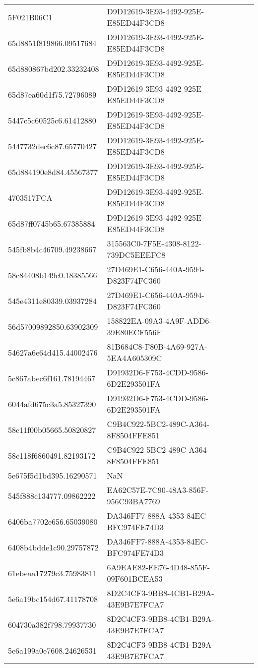 \begin{tabular}{ll}
5F021B06C1 & D9D12619-3E93-4492-925E-E85ED44F3CD8 \\
65d8851f819866.09517684 & D9D12619-3E93-4492-925E-E85ED44F3CD8 \\
65d880867bd202.33232408 & D9D12619-3E93-4492-925E-E85ED44F3CD8 \\
65d87ea60d1f75.72796089 & D9D12619-3E93-4492-925E-E85ED44F3CD8 \\
5447c5c60525c6.61412880 & D9D12619-3E93-4492-925E-E85ED44F3CD8 \\
5447732dec6c87.65770427 & D9D12619-3E93-4492-925E-E85ED44F3CD8 \\
65d884190e8d84.45567377 & D9D12619-3E93-4492-925E-E85ED44F3CD8 \\
4703517FCA & D9D12619-3E93-4492-925E-E85ED44F3CD8 \\
65d87ff0745b65.67385884 & D9D12619-3E93-4492-925E-E85ED44F3CD8 \\
545fb8b4c46709.49238667 & 315563C0-7F5E-4308-8122-739DC5EEEFC8 \\
58c84408b149c0.18385566 & 27D469E1-C656-440A-9594-D823F74FC360 \\
545e4311e80339.03937284 & 27D469E1-C656-440A-9594-D823F74FC360 \\
56d57009892850.63902309 & 158822EA-09A3-4A9F-ADD6-39E80ECF556F \\
54627a6e64d415.44002476 & 81B684C8-F80B-4A69-927A-5EA4A605309C \\
5c867abec6f161.78194467 & D91932D6-F753-4CDD-9586-6D2E293501FA \\
6044afd675c3a5.85327390 & D91932D6-F753-4CDD-9586-6D2E293501FA \\
58c11f00b05665.50820827 & C9B4C922-5BC2-489C-A364-8F8504FFE851 \\
58c118f6860491.82193172 & C9B4C922-5BC2-489C-A364-8F8504FFE851 \\
5e675f5d1bd395.16290571 & NaN \\
545f888c134777.09862222 & EA62C57E-7C90-48A3-856F-956C93BA7769 \\
6406ba7702e656.65039080 & DA346FF7-888A-4353-84EC-BFC974FE74D3 \\
6408b4bdde1c90.29757872 & DA346FF7-888A-4353-84EC-BFC974FE74D3 \\
61ebeaa17279c3.75983811 & 6A9EAE82-EE76-4D48-855F-09F601BCEA53 \\
5e6a19bc154d67.41178708 & 8D2C4CF3-9BB8-4CB1-B29A-43E9B7E7FCA7 \\
604730a382f798.79937730 & 8D2C4CF3-9BB8-4CB1-B29A-43E9B7E7FCA7 \\
5e6a199a0e7608.24626531 & 8D2C4CF3-9BB8-4CB1-B29A-43E9B7E7FCA7 \\

\end{tabular}
